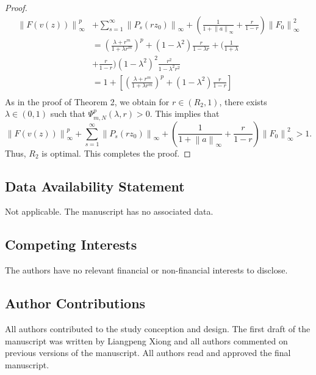 \documentclass{birkjour}
\theoremstyle{plain}
\theoremstyle{definition}
\theoremstyle{definition}
\begin{document}
\begin{proof}
\begin{align*}
		\left \| F(v(z)) \right \|_{\infty}^p &+\sum_{s=1}^{\infty}\left \| P_s(rz_0) \right \|_{\infty}+(\frac{1}{1+\left \| a \right \|_{\infty}} +\frac{r}{1-r}  )\left \| F_0 \right \|^2_{\infty} \\
		&=(\frac{\lambda+r^m }{1+\lambda r^m})^p+(1-\lambda^2)\frac{r}{1-\lambda r}+(\frac{1}{1+\lambda }\\ &+\frac{r}{1-r})(1-\lambda^2)^2\frac{r^2}{1-\lambda^2r^2}\\
		&=1+[(\frac{\lambda+r^m }{1+\lambda r^m})^p+(1-\lambda^2)\frac{r}{1-r}]\\
	\end{align*}
	As in the proof of Theorem 2, we obtain for $r \in (R_2, 1)$, there exists $\lambda \in (0,1)$ such that $\Psi_{m,N}^p(\lambda,r) > 0$. This implies that
	\begin{equation*}
	\left \| F(v(z)) \right \|_{\infty}^p+\sum_{s=1}^{\infty}\left \| P_s(rz_0) \right \|_{\infty}+(\frac{1}{1+\left \| a \right \|_{\infty}} +\frac{r}{1-r}  )\left \| F_0 \right \|^2_{\infty} > 1.
	\end{equation*}
	Thus, $R_2$ is optimal. This completes the proof.
\end{proof}


\subsection*{Data Availability Statement}Not applicable. The manuscript has no associated data.

\subsection*{Competing Interests}The authors have no relevant financial or non-financial interests to disclose.

\subsection*{Author Contributions}All authors contributed to the study conception and design.
The first draft of the manuscript was written by Liangpeng Xiong and all authors commented on previous versions of the manuscript. All authors read and approved the final manuscript.
\end{document}
